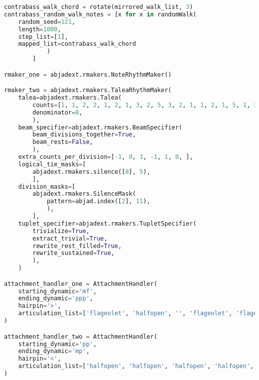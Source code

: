 \begin{lstlisting}[language=Python, caption=Invocation Source Code]
contrabass_walk_chord = rotate(mirrored_walk_list, 3)
contrabass_random_walk_notes = [x for x in randomWalk(
    random_seed=121,
    length=1000,
    step_list=[1],
    mapped_list=contrabass_walk_chord
            )
        ]

rmaker_one = abjadext.rmakers.NoteRhythmMaker()

rmaker_two = abjadext.rmakers.TaleaRhythmMaker(
    talea=abjadext.rmakers.Talea(
        counts=[1, 1, 2, 2, 1, 2, 1, 3, 2, 5, 3, 2, 1, 1, 2, 1, 5, 1, 3, ],
        denominator=8,
        ),
    beam_specifier=abjadext.rmakers.BeamSpecifier(
        beam_divisions_together=True,
        beam_rests=False,
        ),
    extra_counts_per_division=[-1, 0, 1, -1, 1, 0, ],
    logical_tie_masks=[
        abjadext.rmakers.silence([8], 5),
        ],
    division_masks=[
        abjadext.rmakers.SilenceMask(
            pattern=abjad.index([2], 11),
            ),
        ],
    tuplet_specifier=abjadext.rmakers.TupletSpecifier(
        trivialize=True,
        extract_trivial=True,
        rewrite_rest_filled=True,
        rewrite_sustained=True,
        ),
    )

attachment_handler_one = AttachmentHandler(
    starting_dynamic='mf',
    ending_dynamic='ppp',
    hairpin='>',
    articulation_list=['flageolet', 'halfopen', '', 'flageolet', 'flageolet', 'halfopen', '', 'halfopen', 'halfopen', '', '', '', 'flageolet', 'flageolet', 'halfopen', ],
)

attachment_handler_two = AttachmentHandler(
    starting_dynamic='pp',
    ending_dynamic='mp',
    hairpin='<',
    articulation_list=['halfopen', 'halfopen', 'halfopen', 'halfopen', 'halfopen', '', 'halfopen', '', ],
)


\end{lstlisting}
